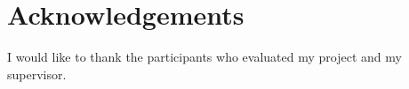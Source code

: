 \section*{Acknowledgements}

I would like to thank the participants who evaluated my project and my supervisor.






